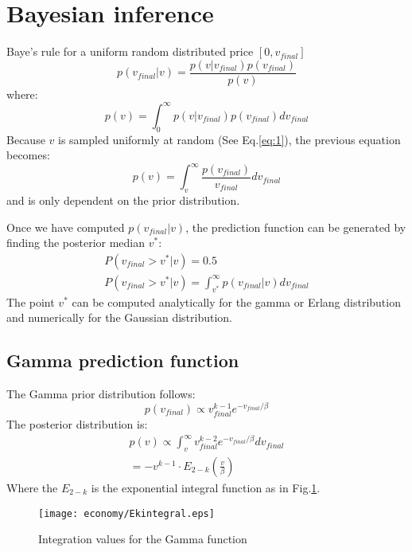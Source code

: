 
\section{Bayesian inference}
Baye's rule for a uniform random distributed price $[0,v_{final}]$
\begin{equation}
 p(v_{final}|v)=\frac{p(v|v_{final}) p(v_{final}) }{p(v)}
\end{equation}
where:
\begin{equation}
 p(v)=\int^{\infty}_{0} p(v|v_{final})p(v_{final}) dv_{final}
\end{equation}
Because $v$ is sampled uniformly at random (See Eq.\ref{eq:1}), the previous equation becomes:
\begin{equation}
 p(v)=\int^{\infty}_{v} \frac{p(v_{final})}{v_{final}} dv_{final}
\end{equation}
and is only dependent on the prior distribution.

Once we have computed  $p(v_{final}|v)$, the prediction function can be generated
 by finding the posterior median $v^*$:
\begin{eqnarray}
P(v_{final}>v^*|v)=0.5\\
P(v_{final}>v^*|v)=\int^{\infty}_{v^*} p(v_{final}|v) dv_{final}
\end{eqnarray}
The point $v^*$ can be computed analytically for the gamma or Erlang distribution
and numerically for the Gaussian distribution.

\subsection{Gamma prediction function}
The Gamma prior distribution follows:
\begin{equation}
 p(v_{final})\varpropto v_{final}^{k-1} e^{-v_{final}/\beta}
\end{equation}
The posterior distribution is:
\begin{eqnarray}
p(v) \varpropto \int^{\infty}_{v} v_{final}^{k-2} e^{-v_{final}/\beta} dv_{final}\\
=-v^{k-1}\cdot E_{2-k}(\frac{v}{\beta})
\end{eqnarray}
Where the $E_{2-k}$ is the exponential integral function as in Fig.\ref{E2k}.

\begin{figure}[!htbp]
	\begin{center}
	\texttt{[image: economy/Ekintegral.eps]}
	\end{center}
	\caption{Integration values for the Gamma function}
	\label{E2k}
\end{figure}

